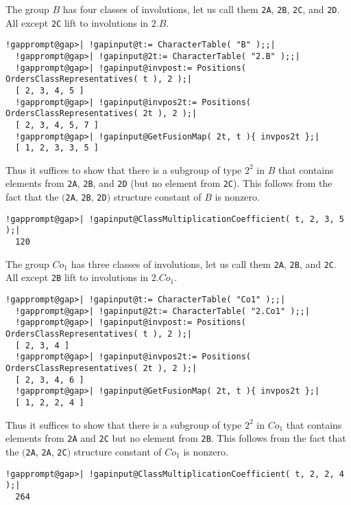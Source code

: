 \documentclass[a4paper,11pt]{report}
\begin{document}
{{{ The group $B$ has four classes of involutions, let us call them \texttt{2A}, \texttt{2B}, \texttt{2C}, and \texttt{2D}. All except \texttt{2C} lift to involutions in $2.B$. 

 
\begin{Verbatim}[commandchars=!@|,fontsize=\small,frame=single,label=Example]
  !gapprompt@gap>| !gapinput@t:= CharacterTable( "B" );;|
  !gapprompt@gap>| !gapinput@2t:= CharacterTable( "2.B" );;|
  !gapprompt@gap>| !gapinput@invpost:= Positions( OrdersClassRepresentatives( t ), 2 );|
  [ 2, 3, 4, 5 ]
  !gapprompt@gap>| !gapinput@invpos2t:= Positions( OrdersClassRepresentatives( 2t ), 2 );|
  [ 2, 3, 4, 5, 7 ]
  !gapprompt@gap>| !gapinput@GetFusionMap( 2t, t ){ invpos2t };|
  [ 1, 2, 3, 3, 5 ]
\end{Verbatim}
 

 Thus it suffices to show that there is a subgroup of type $2^2$ in $B$ that contains elements from \texttt{2A}, \texttt{2B}, and \texttt{2D} (but no element from \texttt{2C}). This follows from the fact that the $($\texttt{2A}, \texttt{2B}, \texttt{2D}$)$ structure constant of $B$ is nonzero. 

 
\begin{Verbatim}[commandchars=!@|,fontsize=\small,frame=single,label=Example]
  !gapprompt@gap>| !gapinput@ClassMultiplicationCoefficient( t, 2, 3, 5 );|
  120
\end{Verbatim}
 

 The group $Co_1$ has three classes of involutions, let us call them \texttt{2A}, \texttt{2B}, and \texttt{2C}. All except \texttt{2B} lift to involutions in $2.Co_1$. 

 
\begin{Verbatim}[commandchars=!@|,fontsize=\small,frame=single,label=Example]
  !gapprompt@gap>| !gapinput@t:= CharacterTable( "Co1" );;|
  !gapprompt@gap>| !gapinput@2t:= CharacterTable( "2.Co1" );;|
  !gapprompt@gap>| !gapinput@invpost:= Positions( OrdersClassRepresentatives( t ), 2 );|
  [ 2, 3, 4 ]
  !gapprompt@gap>| !gapinput@invpos2t:= Positions( OrdersClassRepresentatives( 2t ), 2 );|
  [ 2, 3, 4, 6 ]
  !gapprompt@gap>| !gapinput@GetFusionMap( 2t, t ){ invpos2t };|
  [ 1, 2, 2, 4 ]
\end{Verbatim}
 

 Thus it suffices to show that there is a subgroup of type $2^2$ in $Co_1$ that contains elements from \texttt{2A} and \texttt{2C} but no element from \texttt{2B}. This follows from the fact that the $($\texttt{2A}, \texttt{2A}, \texttt{2C}$)$ structure constant of $Co_1$ is nonzero. 
\begin{Verbatim}[commandchars=!@|,fontsize=\small,frame=single,label=Example]
  !gapprompt@gap>| !gapinput@ClassMultiplicationCoefficient( t, 2, 2, 4 );|
  264
\end{Verbatim}
 

}}}
\end{document}
